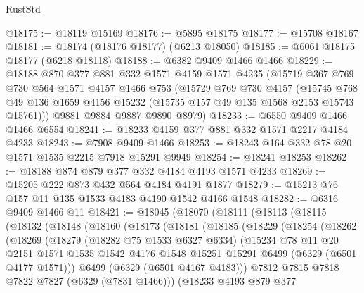 \begin{lexlean}{RustStd}
\begin{coremodule}
{{@18175 := @18119 @15169
@18176 := @5895 @18175
@18177 := @15708 @18167
@18181 := @18174 (@18176 @18177) (@6213 @18050)
@18185 := @6061 @18175 @18177 (@6218 @18118)
@18188 := @6382 @9409 @1466 @1466
@18229 := @18188
    @870
    @377
    @881
    @332
    @1571
    @4159
    @1571
    @4235
    (@15719
      @367
      @769
      @730
      @564
      @1571
      @4157
      @1466
      @753
      (@15729
        @769
        @730
        @4157
        (@15745 @768 @49 @136 @1659 @4156 @15232 (@15735 @157 @49 @135 @1568 @2153 @15743 @15761)))
      @9881
      @9884
      @9887
      @9890
      @8979)
@18233 := @6550 @9409 @1466 @1466 @6554
@18241 := @18233 @4159 @377 @881 @332 @1571 @2217 @4184 @4233
@18243 := @7908 @9409 @1466
@18253 := @18243 @164 @332 @78 @20 @1571 @1535 @2215 @7918 @15291 @9949
@18254 := @18241 @18253
@18262 := @18188 @874 @879 @377 @332 @4184 @4193 @1571 @4233
@18269 := @15205 @222 @873 @432 @564 @4184 @4191 @1877
@18279 := @15213 @76 @157 @11 @135 @1533 @4183 @4190 @1542 @4166 @1548
@18282 := @6316 @9409 @1466 @11
@18421 := @18045
    (@18070
      (@18111
        (@18113
          (@18115
            (@18132
              (@18148
                (@18160
                  (@18173
                    (@18181
                      (@18185
                        (@18229
                          (@18254
                            (@18262
                              (@18269
                                (@18279
                                  (@18282 @75 @1533 @6327 @6334)
                                  (@15234
                                    @78
                                    @11
                                    @20
                                    @2151
                                    @1571
                                    @1535
                                    @1542
                                    @4176
                                    @1548
                                    @15251
                                    @15291
                                    @6499
                                    (@6329 (@6501 @4177 @1571)))
                                  @6499
                                  (@6329 (@6501 @4167 @4183)))
                                @7812
                                @7815
                                @7818
                                @7822
                                @7827
                                (@6329 (@7831 @1466)))
                              (@18233
                                @4193
                                @879
                                @377
}}
\end{coremodule}
\end{lexlean}
